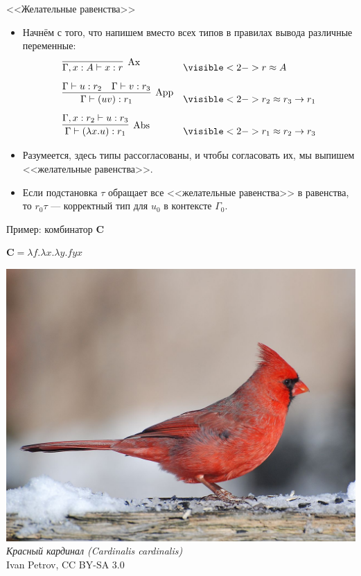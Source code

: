 \documentclass[xcolor=dvipsnames]{beamer}
\newcommand{\Cx}{\mathbf{C}}
\begin{document}
\begin{frame}{<<Желательные равенства>>}

\begin{itemize}
 \item Начнём с того, что напишем вместо всех типов в правилах вывода различные переменные:
 \begin{align*}
  & \infer[\mathrm{Ax}]{\Gamma, x : A \vdash x : r}{} && \visible<2->{r \approx A}\\[5pt]
  & \infer[\mathrm{App}]{\Gamma  \vdash (uv) : r_1}
  {\Gamma \vdash u : r_2 & \Gamma \vdash v : r_3} &&  \visible<2->{r_2 \approx r_3 \to r_1} \\[5pt]
  & \infer[\mathrm{Abs}]
  {\Gamma \vdash (\lambda x.  u) : r_1}
  {\Gamma, x : r_2 \vdash u : r_3} && \visible<2->{r_1 \approx r_2 \to r_3}
 \end{align*}
 \item<2-> Разумеется, здесь типы рассогласованы, и чтобы согласовать их, мы выпишем <<желательные равенства>>.
 \item<3-> Если подстановка $\tau$ обращает все <<желательные равенства>> в равенства, то $r_0\tau$ --- корректный тип для $u_0$ в контексте $\Gamma_0$.
\end{itemize}

 
\end{frame}

\begin{frame}{Пример: комбинатор $\Cx$}
 
 $\Cx = \lambda f. \lambda x. \lambda y. f y x$
 
 \begin{center}
  \vspace*{3pt}
    \includegraphics[scale=.7]{CardinalMale2007.jpg}\\ \vspace*{-3pt}
    {\sl Красный кардинал (Cardinalis cardinalis)}\\
    \vspace*{-8pt}
    {\tiny\color{gray}\sf Ivan Petrov, CC BY-SA 3.0}
  \end{center}

 
\end{frame}
\end{document}
